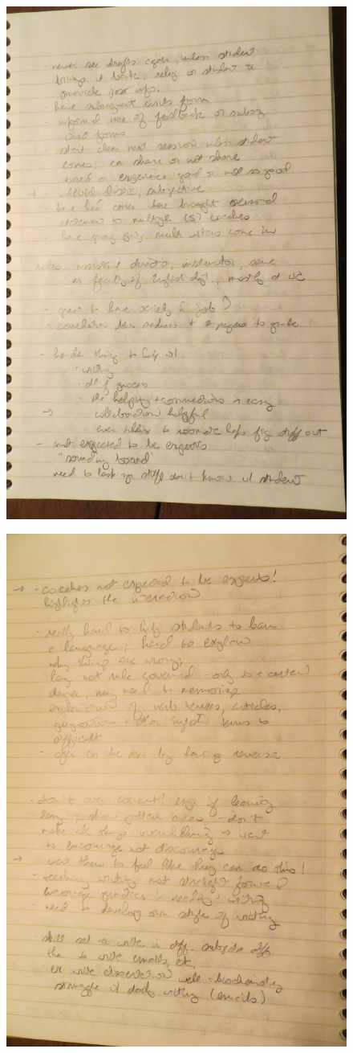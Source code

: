 \documentclass[12pt]{article} %
\begin{document}
  \begin{figure}[H]
  \centering
  \includegraphics[width=0.75\linewidth]{RAZ_raw_notes5}
  \caption{}
  \label{fig:rn5}
  \end{figure}
  \begin{figure}[H]
  \centering
  \includegraphics[width=0.75\linewidth]{RAZ_raw_notes6}
  \caption{}
  \label{fig:rn6}
  \end{figure}
\end{document}
